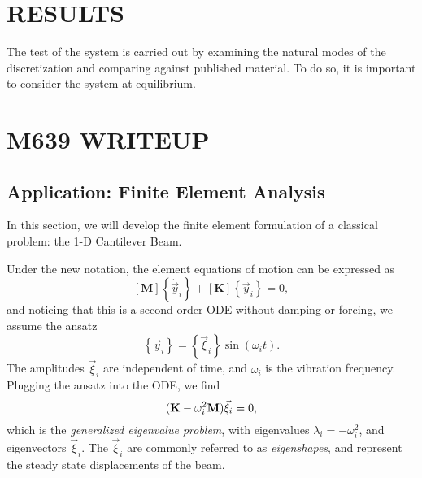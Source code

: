 \chapter{RESULTS}
\label{ch:results}
The test of the system is carried out by examining the natural modes of the discretization and comparing against published material. To do so, it is important to consider the system at equilibrium. 


\chapter{M639 WRITEUP}
\label{M639}

\section{Application: Finite Element Analysis}
In this section, we will develop the finite element formulation of a classical problem: the 1-D Cantilever Beam.

Under the new notation, the element equations of motion can be expressed as
\[
[\textbf{M}]\left\{\ddot{\vec y}_i\right\}+[\textbf{K}]\left\{\vec y_i\right\} = 0,
\]
and noticing that this is a second order ODE without damping or forcing, we assume the ansatz
\[
\left\{\vec y_i\right\} = \left\{\vec \xi_i\right\}\sin(\omega_i t).
\]
The amplitudes $\vec \xi_i$ are independent of time, and $\omega_i$ is the vibration frequency.
Plugging the ansatz into the ODE, we find
\[
(\textbf K-\omega_i^2\textbf M)\vec \xi_i = 0,
\]
which is the \emph{generalized eigenvalue problem}, with eigenvalues $\lambda_i = -\omega_i^2$, and eigenvectors $\vec \xi_i$. The $\vec\xi_i$ are commonly referred to as \emph{eigenshapes}, and represent the steady state displacements of the beam.\newline
